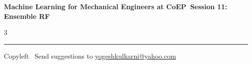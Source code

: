 \documentclass[8pt,landscape]{article}
\begin{document}
\footnotesize

\begin{center}
\Large{\textbf{Machine Learning for Mechanical Engineers at CoEP\ Session 11: Ensemble RF}}
\end{center}

\begin{multicols}{3}

\end{multicols}

\rule{\linewidth}{0.25pt}
\scriptsize
Copyleft \textcopyleft\  Send suggestions to
\href{http://www.yogeshkulkarni.com}{yogeshkulkarni@yahoo.com}
\end{document}
